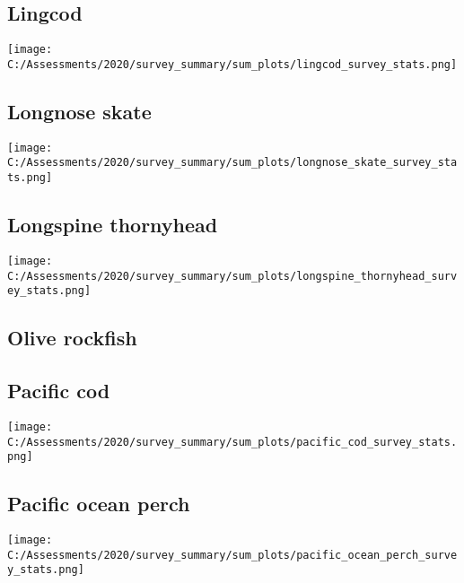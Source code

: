 \documentclass[12pt,]{article}
\begin{document}
\FloatBarrier

\hypertarget{lingcod}{%
\subsection{Lingcod}\label{lingcod}}

\texttt{[image: C:/Assessments/2020/survey\_summary/sum\_plots/lingcod\_survey\_stats.png]}
\FloatBarrier  

\hypertarget{longnose-skate}{%
\subsection{Longnose skate}\label{longnose-skate}}

\texttt{[image: C:/Assessments/2020/survey\_summary/sum\_plots/longnose\_skate\_survey\_stats.png]}
\FloatBarrier  

\hypertarget{longspine-thornyhead}{%
\subsection{Longspine thornyhead}\label{longspine-thornyhead}}

\texttt{[image: C:/Assessments/2020/survey\_summary/sum\_plots/longspine\_thornyhead\_survey\_stats.png]}
\FloatBarrier  

\hypertarget{olive-rockfish}{%
\subsection{Olive rockfish}\label{olive-rockfish}}

\FloatBarrier

\hypertarget{pacific-cod}{%
\subsection{Pacific cod}\label{pacific-cod}}

\texttt{[image: C:/Assessments/2020/survey\_summary/sum\_plots/pacific\_cod\_survey\_stats.png]}
\FloatBarrier  

\hypertarget{pacific-ocean-perch}{%
\subsection{Pacific ocean perch}\label{pacific-ocean-perch}}

\texttt{[image: C:/Assessments/2020/survey\_summary/sum\_plots/pacific\_ocean\_perch\_survey\_stats.png]}
\FloatBarrier  
\end{document}
